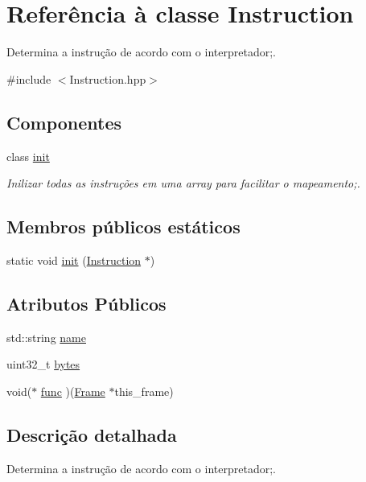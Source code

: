 \hypertarget{class_instruction}{}\section{Referência à classe Instruction}
\label{class_instruction}


Determina a instrução de acordo com o interpretador;.  




{\ttfamily \#include $<$Instruction.\+hpp$>$}

\subsection*{Componentes}
\begin{DoxyCompactItemize}
\item 
class \hyperlink{class_instruction_1_1init}{init}
\begin{DoxyCompactList}\small\item\em Inilizar todas as instruções em uma array para facilitar o mapeamento;. \end{DoxyCompactList}\end{DoxyCompactItemize}
\subsection*{Membros públicos estáticos}
\begin{DoxyCompactItemize}
\item 
static void \hyperlink{class_instruction_a145a172552303c9cbd8a5856e31a701b}{init} (\hyperlink{class_instruction}{Instruction} $\ast$)
\end{DoxyCompactItemize}
\subsection*{Atributos Públicos}
\begin{DoxyCompactItemize}
\item 
std\+::string \hyperlink{class_instruction_abfd1615a8bb140e70b3724214deee7df}{name}
\item 
uint32\+\_\+t \hyperlink{class_instruction_a1052c075af597277407bece6db3f2bef}{bytes}
\item 
void($\ast$ \hyperlink{class_instruction_a1f4648eed807151537ef72c78d65081f}{func} )(\hyperlink{struct_frame}{Frame} $\ast$this\+\_\+frame)
\end{DoxyCompactItemize}


\subsection{Descrição detalhada}
Determina a instrução de acordo com o interpretador;. 

